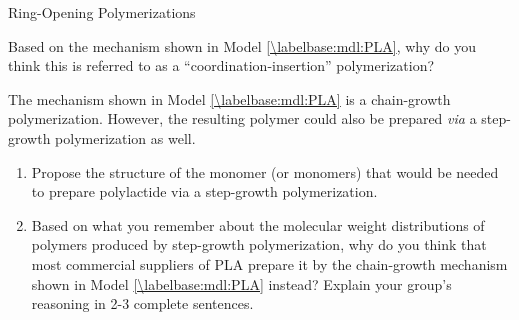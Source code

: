 \begin{activity}{Ring-Opening Polymerizations}
\begin{ctqs}
\begin{enumerate}
		\end{enumerate}
		
	\question Based on the mechanism shown in Model \ref{\labelbase:mdl:PLA}, why do you think this is referred to as a ``coordination-insertion'' polymerization?
			
				\begin{solution}[1in]
				\end{solution}
	
	\question The mechanism shown in Model \ref{\labelbase:mdl:PLA} is a chain-growth polymerization.  However, the resulting polymer could also be prepared \emph{via} a step-growth polymerization as well.
	
		\begin{enumerate}
			\item Propose the structure of the monomer (or monomers) that would be needed to prepare polylactide via a step-growth polymerization.
			
				\begin{solution}[1.5in]
				\end{solution}
			
			\item Based on what you remember about the molecular weight distributions of polymers produced by step-growth polymerization, why do you think that most commercial suppliers of PLA prepare it by the chain-growth mechanism shown in Model \ref{\labelbase:mdl:PLA} instead?  Explain your group's reasoning in 2-3 complete sentences.
			
				\begin{solution}[1.5in]
				\end{solution}
		\end{enumerate}
	
\end{ctqs}





	


%
%	


	
\end{activity}